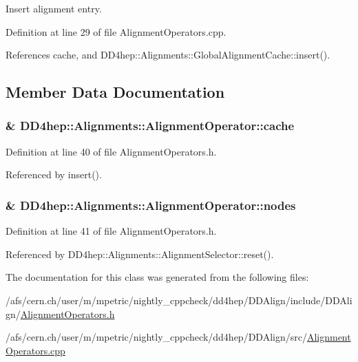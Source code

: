 Insert alignment entry. 

Definition at line 29 of file AlignmentOperators.cpp.

References cache, and DD4hep::Alignments::GlobalAlignmentCache::insert().

\subsection{Member Data Documentation}
\hypertarget{class_d_d4hep_1_1_alignments_1_1_alignment_operator_a931deb1a003ec4c619fae0b0d728f8d2}{
\subsubsection[{cache}]{\& {\bf DD4hep::Alignments::AlignmentOperator::cache}}}
\label{class_d_d4hep_1_1_alignments_1_1_alignment_operator_a931deb1a003ec4c619fae0b0d728f8d2}


Definition at line 40 of file AlignmentOperators.h.

Referenced by insert().\hypertarget{class_d_d4hep_1_1_alignments_1_1_alignment_operator_a3af1a13de9f4772b04471070b6b99676}{
\subsubsection[{nodes}]{\& {\bf DD4hep::Alignments::AlignmentOperator::nodes}}}
\label{class_d_d4hep_1_1_alignments_1_1_alignment_operator_a3af1a13de9f4772b04471070b6b99676}


Definition at line 41 of file AlignmentOperators.h.

Referenced by DD4hep::Alignments::AlignmentSelector::reset().

The documentation for this class was generated from the following files:\begin{DoxyCompactItemize}
\item 
/afs/cern.ch/user/m/mpetric/nightly\_\-cppcheck/dd4hep/DDAlign/include/DDAlign/\hyperlink{_alignment_operators_8h}{AlignmentOperators.h}\item 
/afs/cern.ch/user/m/mpetric/nightly\_\-cppcheck/dd4hep/DDAlign/src/\hyperlink{_alignment_operators_8cpp}{AlignmentOperators.cpp}\end{DoxyCompactItemize}
